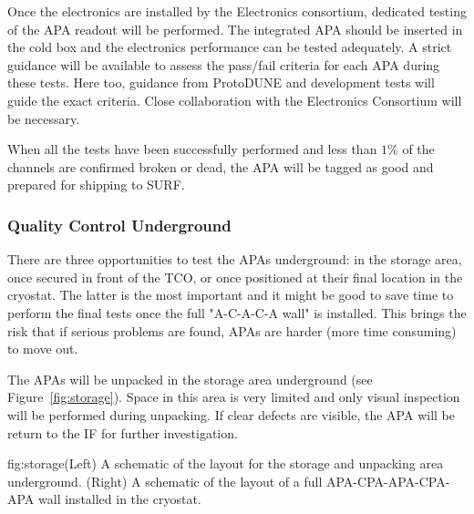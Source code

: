 Once the electronics are installed by the Electronics consortium, dedicated testing of the APA readout will be performed. The integrated APA should be inserted in the cold box and the electronics performance can be tested adequately. A strict guidance will be available to assess the pass/fail criteria for each APA during these tests. Here too, guidance from ProtoDUNE and development tests will guide the exact criteria. Close collaboration with the Electronics Consortium will be necessary.

When all the tests have been successfully performed and less than $1\%$ of the channels are confirmed broken or dead, the APA will be tagged as good and prepared for shipping to SURF.

\subsubsection{Quality Control Underground}
\label{sec:fdsp-apa-install-qc_underground}

There are three opportunities to test the APAs underground: in the storage area, once secured in front of the TCO, or once positioned at their final location in the cryostat. The latter is the most important and it might be good to save time to perform the final tests once the full "A-C-A-C-A wall" is installed. This brings the risk that if serious problems are found, APAs are harder (more time consuming) to move out.

The APAs will be unpacked in the storage area underground (see Figure~\ref{fig:storage}). Space in this area is very limited and only visual inspection will be performed during unpacking. If clear defects are visible, the APA will be return to the IF for further investigation.

\begin{dunefigure}{fig:storage}{(Left) A schematic of the layout for the storage and unpacking area underground. (Right) A schematic of the layout of a full APA-CPA-APA-CPA-APA wall installed in the cryostat.}
\setlength{\fboxsep}{0pt}
\setlength{\fboxrule}{0.5pt}
\end{dunefigure}

